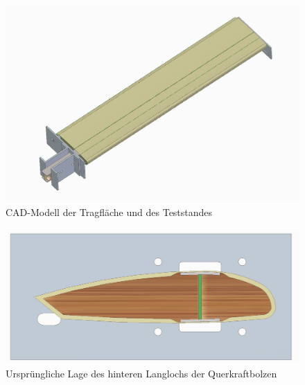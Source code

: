 \newpage





\begin{figure}[h]
	\includegraphics[width=1.0\textwidth]{Bilder/AufbauGesamt.jpg}
	\caption{CAD-Modell der Tragfläche und des Teststandes}
	\label{fig:AufbauGesamt}
\end{figure}

\begin{figure}[h]
	\includegraphics[width=1.0\textwidth]{Bilder/SeiteRichtig.jpg}
	\caption{Ursprüngliche Lage des hinteren Langlochs der Querkraftbolzen}
	\label{fig: SeiteRichtig}
\end{figure}

